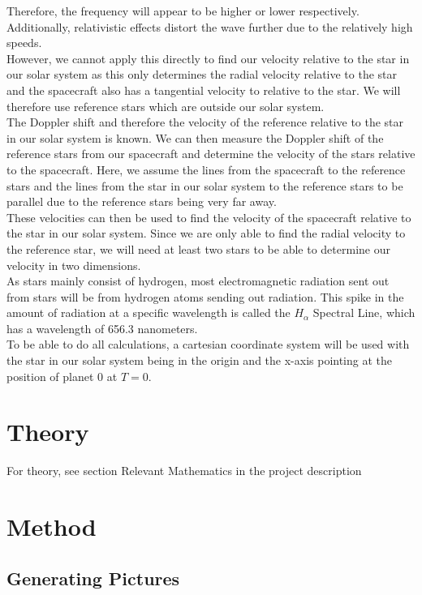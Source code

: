 \documentclass[reprint,english,notitlepage]{revtex4-2}
\begin{document}
Therefore, the frequency will appear to be higher or lower respectively.
Additionally, relativistic effects distort the wave further due to the relatively high speeds.\\
However, we cannot apply this directly to find our velocity relative to the star in our solar system as this only determines the radial velocity relative to the star and the spacecraft also has a tangential velocity to relative to the star.
We will therefore use reference stars which are outside our solar system.\\
The Doppler shift and therefore the velocity of the reference relative to the star in our solar system is known.
We can then measure the Doppler shift of the reference stars from our spacecraft and determine the velocity of the stars relative to the spacecraft.
Here, we assume the lines from the spacecraft to the reference stars and the lines from the star in our solar system to the reference stars to be parallel due to the reference stars being very far away.\\
These velocities can then be used to find the velocity of the spacecraft relative to the star in our solar system.
Since we are only able to find the radial velocity to the reference star, we will need at least two stars to be able to determine our velocity in two dimensions.\\
As stars mainly consist of hydrogen, most electromagnetic radiation sent out from stars will be from hydrogen atoms sending out radiation.
This spike in the amount of radiation at a specific wavelength is called the $H_{\alpha}$ Spectral Line, which has a wavelength of 656.3 nanometers.\\
To be able to do all calculations, a cartesian coordinate system will be used with the star in our solar system being in the origin and the x-axis pointing at the position of planet 0 at $T = 0$.

\section{Theory} \label{sec:theory}
For theory, see section Relevant Mathematics in the project description~\parencite[][]{Relevant_theory}

\section{Method} \label{sec:method}
\subsection{Generating Pictures} \label{subsec: generating pictures}
\end{document}
